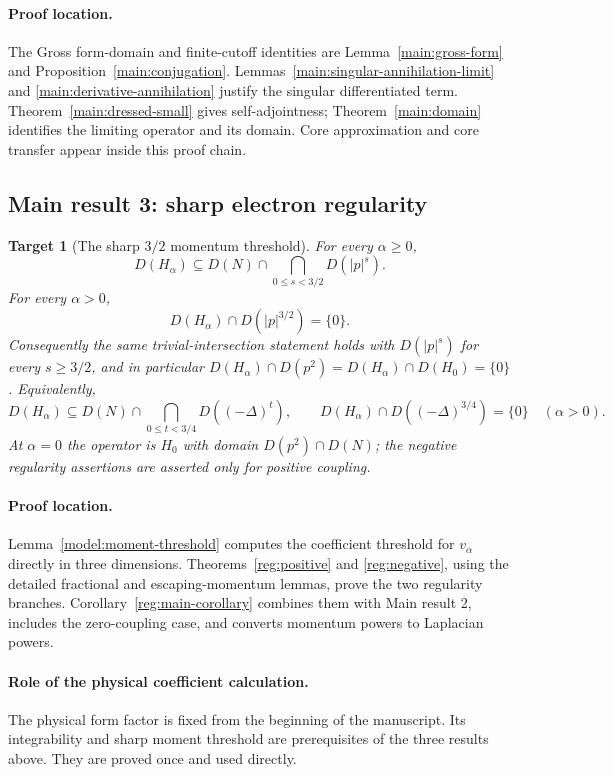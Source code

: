 \documentclass[11pt,a4paper]{article}
\newtheorem{target}{Target}
\theoremstyle{definition}
\theoremstyle{remark}
\begin{document}
\paragraph{Proof location.}
The Gross form-domain and finite-cutoff identities are
Lemma~\ref{main:gross-form} and Proposition~\ref{main:conjugation}.
Lemmas~\ref{main:singular-annihilation-limit} and
\ref{main:derivative-annihilation} justify the singular differentiated
term. Theorem~\ref{main:dressed-small} gives self-adjointness;
Theorem~\ref{main:domain} identifies the limiting operator and its domain.
Core approximation and core transfer appear inside this proof chain.

\subsection{Main result 3: sharp electron regularity}

\begin{target}[The sharp $3/2$ momentum threshold]
\label{target:regularity}
For every $\alpha\geq0$,
\[
 D(H_\alpha)\subseteq D(N)\cap
             \bigcap_{0\leq s<3/2}D(|p|^s).
\]
For every $\alpha>0$,
\[
 \boxed{\ D(H_\alpha)\cap D(|p|^{3/2})=\{0\}.\ }
\]
Consequently the same trivial-intersection statement holds with
$D(|p|^s)$ for every $s\geq3/2$, and in particular
$D(H_\alpha)\cap D(p^2)=D(H_\alpha)\cap D(H_0)=\{0\}$.
Equivalently,
\[
 D(H_\alpha)\subseteq D(N)\cap
           \bigcap_{0\leq t<3/4}D((-\Delta)^t),\qquad
 D(H_\alpha)\cap D((-\Delta)^{3/4})=\{0\}\quad(\alpha>0).
\]
At $\alpha=0$ the operator is $H_0$ with domain $D(p^2)\cap D(N)$;
the negative regularity assertions are asserted only for positive coupling.
\end{target}

\paragraph{Proof location.}
Lemma~\ref{model:moment-threshold} computes the coefficient threshold
for $v_\alpha$ directly in three dimensions. Theorems~\ref{reg:positive}
and \ref{reg:negative}, using the detailed fractional and escaping-momentum
lemmas, prove the two regularity branches. Corollary~\ref{reg:main-corollary}
combines them with Main result 2, includes the zero-coupling case, and
converts momentum powers to Laplacian powers.

\paragraph{Role of the physical coefficient calculation.}
The physical form factor is fixed from the beginning of the manuscript.
Its integrability and sharp moment threshold are prerequisites of the
three results above. They are proved once and used directly.
\end{document}
